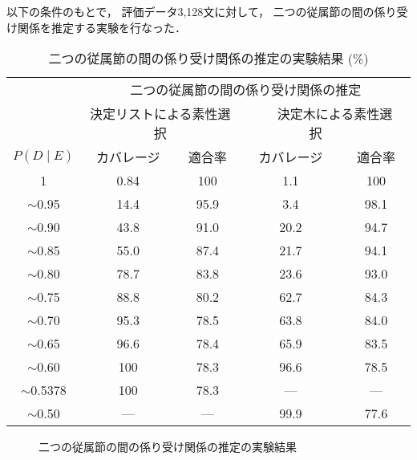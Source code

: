 以下の条件のもとで，
評価データ3,128文に対して，
二つの従属節の間の係り受け関係を推定する実験を行なった．
\begin{table}
\begin{center}
\caption{二つの従属節の間の係り受け関係の推定の実験結果 (\%)}  
\label{tab:ressub}
\begin{tabular}[c]{|c||c|c||c|c|} \hline
        & \multicolumn{4}{|c|}{二つの従属節の間の係り受け関係の推定}   \\ \cline{2-5}        
        &    \multicolumn{2}{|c||}{決定リストによる素性選択} 
        &    \multicolumn{2}{|c|}{\ \ \ 決定木による素性選択\ \ \ } \\ \cline{2-5}
$P(D\mid E)$ & カバレージ & 適合率 & カバレージ & 適合率  \\ \hline\hline
1          & 0.84 & 100 & 1.1   & 100   \\
$\sim$0.95 & 14.4 & 95.9 & 3.4  & 98.1  \\
$\sim$0.90 & 43.8 & 91.0 & 20.2 & 94.7  \\
$\sim$0.85 & 55.0 & 87.4 & 21.7 & 94.1  \\
$\sim$0.80 & 78.7 & 83.8 & 23.6 & 93.0  \\
$\sim$0.75 & 88.8 & 80.2 & 62.7 & 84.3  \\
$\sim$0.70 & 95.3 & 78.5 & 63.8 & 84.0  \\
$\sim$0.65 & 96.6 & 78.4 & 65.9 & 83.5  \\
$\sim$0.60 & 100 & 78.3 & 96.6  & 78.5  \\
$\sim$0.5378 & 100 & 78.3 & --- &  ---  \\
$\sim$0.50 & --- & --- &         99.9  & 77.6   \\ \hline
\end{tabular}
\end{center}
\end{table}
\begin{figure}[t]
\vspace{-2mm}
  \begin{center}
\vspace{-2mm}
        \caption{二つの従属節の間の係り受け関係の推定の実験結果}
        \label{fig:resseg}
  \end{center}
\end{figure}


